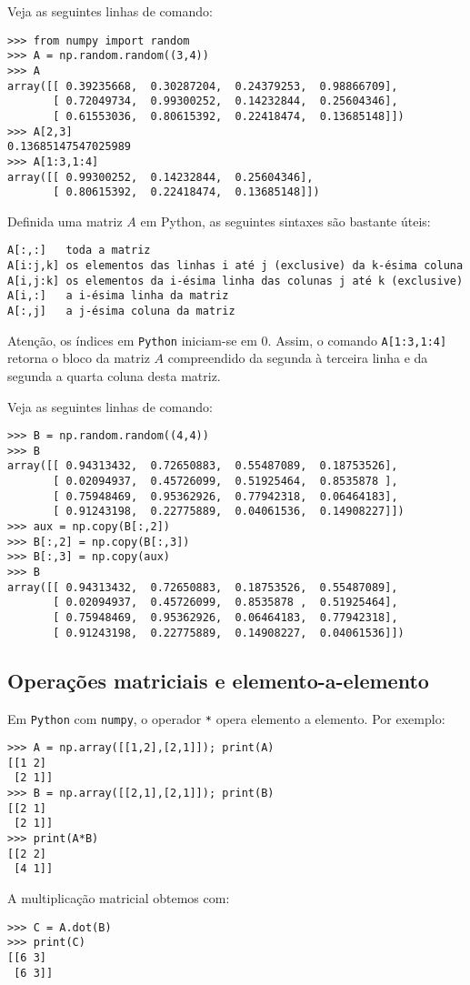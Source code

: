 \begin{ex}
  Veja as seguintes linhas de comando:
\begin{verbatim}
>>> from numpy import random
>>> A = np.random.random((3,4))
>>> A
array([[ 0.39235668,  0.30287204,  0.24379253,  0.98866709],
       [ 0.72049734,  0.99300252,  0.14232844,  0.25604346],
       [ 0.61553036,  0.80615392,  0.22418474,  0.13685148]])
>>> A[2,3]
0.13685147547025989
>>> A[1:3,1:4]
array([[ 0.99300252,  0.14232844,  0.25604346],
       [ 0.80615392,  0.22418474,  0.13685148]])
\end{verbatim}
\end{ex}

Definida uma matriz $A$ em Python, as seguintes sintaxes são bastante úteis:
\begin{verbatim}
A[:,:]   toda a matriz
A[i:j,k] os elementos das linhas i até j (exclusive) da k-ésima coluna
A[i,j:k] os elementos da i-ésima linha das colunas j até k (exclusive)
A[i,:]   a i-ésima linha da matriz
A[:,j]   a j-ésima coluna da matriz
\end{verbatim}

Atenção, os índices em \verb+Python+ iniciam-se em $0$. Assim, o comando \verb+A[1:3,1:4]+ retorna o bloco da matriz $A$ compreendido da segunda à terceira linha e da segunda a quarta coluna desta matriz. 

\begin{ex}
Veja as seguintes linhas de comando:
\begin{verbatim}
>>> B = np.random.random((4,4))
>>> B
array([[ 0.94313432,  0.72650883,  0.55487089,  0.18753526],
       [ 0.02094937,  0.45726099,  0.51925464,  0.8535878 ],
       [ 0.75948469,  0.95362926,  0.77942318,  0.06464183],
       [ 0.91243198,  0.22775889,  0.04061536,  0.14908227]])
>>> aux = np.copy(B[:,2])
>>> B[:,2] = np.copy(B[:,3])
>>> B[:,3] = np.copy(aux)
>>> B
array([[ 0.94313432,  0.72650883,  0.18753526,  0.55487089],
       [ 0.02094937,  0.45726099,  0.8535878 ,  0.51925464],
       [ 0.75948469,  0.95362926,  0.06464183,  0.77942318],
       [ 0.91243198,  0.22775889,  0.14908227,  0.04061536]])
\end{verbatim}
\end{ex}

\subsection{Operações matriciais e elemento-a-elemento}

Em \verb+Python+ com \verb+numpy+, o operador \verb+*+ opera elemento a elemento. Por exemplo:
\begin{verbatim}
>>> A = np.array([[1,2],[2,1]]); print(A)
[[1 2]
 [2 1]]
>>> B = np.array([[2,1],[2,1]]); print(B)
[[2 1]
 [2 1]]
>>> print(A*B)
[[2 2]
 [4 1]]
\end{verbatim}
A multiplicação matricial obtemos com:
\begin{verbatim}
>>> C = A.dot(B)
>>> print(C)
[[6 3]
 [6 3]]
\end{verbatim}

